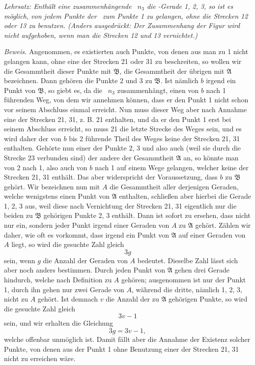 \documentclass[11pt,a4paper]{article}
\begin{document}
\emph{Lehrsatz: Enthält eine zusammenhängende \Cf\ $n_3$ die \Cf-Gerade 1, 2, 3, so ist es möglich, von jedem Punkte der \Cf\ zum Punkte 1 zu gelangen, ohne die Strecken 12 oder 13 zu benutzen. (Anders ausgedrückt: Der Zusammenhang der Figur wird nicht aufgehoben, wenn man die Strecken 12 und 13 vernichtet.)}

\emph{Beweis.} Angenommen, es existierten auch Punkte, von denen aus man zu 1 nicht gelangen kann, ohne eine der Strecken 21 oder 31 zu beschreiten, so wollen wir die Gesammtheit dieser Punkte mit $\mathfrak B$, die Gesammtheit der übrigen mit $\mathfrak A$ bezeichnen. Dann gehören die Punkte 2 und 3 zu $\mathfrak B$. Ist nämlich $b$ irgend ein Punkt von $\mathfrak B$, so giebt es, da die \Cf\ $n_3$ zusammenhängt, einen von $b$ nach 1 führenden Weg, von dem wir annehmen können, dass er den Punkt 1 nicht schon vor seinem Abschluss einmal erreicht. Nun muss dieser Weg aber nach Annahme eine der Strecken 21, 31, z. B. 21 enthalten, und da er den Punkt 1 erst bei seinem Abschluss erreicht, so muss 21 die letzte Strecke des Weges sein, und es wird daher der von $b$ bis 2 führende Theil des Weges keine der Strecken 21, 31 enthalten. Gehörte nun einer der Punkte 2, 3 und also auch (weil sie durch die Strecke 23 verbunden sind) der andere der Gesammtheit $\mathfrak A$ an, so könnte man von 2 nach 1, also auch von $b$ nach 1 auf einem Wege gelangen, welcher keine der Strecken 21, 31 enthält. Das aber widerspricht der Voraussetzung, dass $b$ zu $\mathfrak B$ gehört. Wir bezeichnen nun mit $A$ die Gesammtheit aller derjenigen Geraden, welche wenigstens einen Punkt von $\mathfrak A$ enthalten, schließen aber hierbei die Gerade 1, 2, 3 aus, weil diese nach Vernichtung der Strecken 21, 31 eigentlich nur die beiden zu $\mathfrak B$ gehörigen Punkte 2, 3 enthält. Dann ist sofort zu ersehen, dass nicht nur ein, sondern jeder Punkt irgend einer Geraden von $A$ zu $\mathfrak A$ gehört. Zählen wir daher, wie oft es vorkommt, dass irgend ein Punkt von $\mathfrak A$ auf einer Geraden von $A$ liegt, so wird die gesuchte Zahl gleich
\[
3g
\]
sein, wenn $g$ die Anzahl der Geraden von $A$ bedeutet. Dieselbe Zahl lässt sich aber noch anders bestimmen. Durch jeden Punkt von $\mathfrak A$ gehen drei Gerade hindurch, welche nach Definition zu $A$ gehören; ausgenommen ist nur der Punkt 1, durch ihn gehen nur zwei Gerade von $A$, während die dritte, nämlich 1, 2, 3, nicht zu $A$ gehört. Ist demnach $v$ die Anzahl der zu $\mathfrak A$ gehörigen Punkte, so wird die gesuchte Zahl gleich
\[
3v-1
\]
sein, und wir erhalten die Gleichung
\[
3g=3v-1,
\]
welche offenbar unmöglich ist. Damit fällt aber die Annahme der Existenz solcher Punkte, von denen aus der Punkt 1 ohne Benutzung einer der Strecken 21, 31 nicht zu erreichen wäre.
\end{document}
